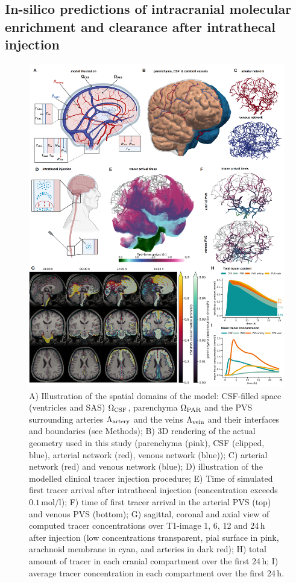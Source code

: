 \documentclass[fleqn,10pt]{wlscirep}
\newcommand{\mer}[1]{\textcolor{magenta}{#1}}
\begin{document}
\subsection*{In-silico predictions of intracranial molecular enrichment and clearance after intrathecal injection}
\begin{figure}
    \centering
    \includegraphics[width=0.95 \textwidth]{figures/figure1.png}
     \caption{A) Illustration of the spatial domains of the model: CSF-filled space (ventricles and SAS) $\Omega_{\rm CSF}$, parenchyma $\Omega_{\rm PAR}$ and the PVS surrounding arteries $\Lambda_{\rm artery}$ and the veins $\Lambda_{\rm vein}$ and their interfaces and boundaries (see Methods); B) 3D rendering of the actual geometry used in this study (parenchyma (pink), CSF (clipped, blue), arterial network (red), venous network (blue)); C) arterial network (red) and venous network (blue); D) illustration of the modelled clinical tracer injection procedure; E) Time of simulated first tracer arrival after intrathecal injection (concentration exceeds $0.1\,$mol/l); F) time of first tracer arrival in the arterial PVS (top) and venous PVS (bottom); G) sagittal, coronal and axial view of computed tracer concentrations over T1-image 1, 6, 12 and 24\,h after injection (low concentrations transparent, pial surface in pink, arachnoid membrane in cyan, and arteries in dark red); H) total amount of tracer in each cranial compartment over the first 24\,h; I) average tracer concentration in each compartment over the first 24\,h. }
     \label{fig:results1}
\end{figure}
\end{document}
